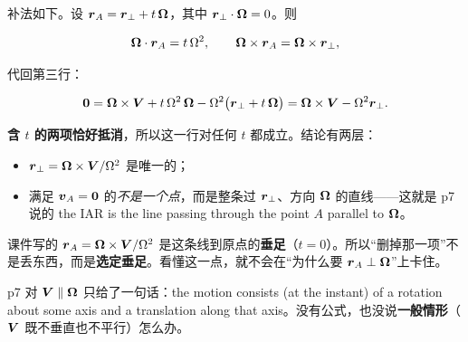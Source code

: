 \documentclass[11pt]{ctexart}
\begin{document}

补法如下。设 $\boldsymbol{r}_A=\boldsymbol{r}_\perp+t\,\boldsymbol{\Omega}$，其中 $\boldsymbol{r}_\perp\cdot\boldsymbol{\Omega}=0$。则

\[
\boldsymbol{\Omega}\cdot\boldsymbol{r}_A=t\,\Omega^{2},
\qquad
\boldsymbol{\Omega}\times\boldsymbol{r}_A=\boldsymbol{\Omega}\times\boldsymbol{r}_\perp ,
\]

代回第三行：

\[
\boldsymbol{0}=\boldsymbol{\Omega}\times\boldsymbol{V}
+t\,\Omega^{2}\,\boldsymbol{\Omega}
-\Omega^{2}\bigl(\boldsymbol{r}_\perp+t\,\boldsymbol{\Omega}\bigr)
=\boldsymbol{\Omega}\times\boldsymbol{V}-\Omega^{2}\boldsymbol{r}_\perp .
\]

\textbf{含 $t$ 的两项恰好抵消}，所以这一行对任何 $t$ 都成立。结论有两层：

\begin{itemize}
\item $\boldsymbol{r}_\perp=\boldsymbol{\Omega}\times\boldsymbol{V}/\Omega^{2}$ 是唯一的；
\item 满足 $\boldsymbol{v}_A=\boldsymbol{0}$ 的\emph{不是一个点}，而是整条过 $\boldsymbol{r}_\perp$、方向 $\boldsymbol{\Omega}$ 的直线——这就是 p7 说的 the IAR is the line passing through the point $A$ parallel to $\boldsymbol{\Omega}$。
\end{itemize}

课件写的 $\boldsymbol{r}_A=\boldsymbol{\Omega}\times\boldsymbol{V}/\Omega^{2}$ 是这条线到原点的\textbf{垂足}（$t=0$）。所以“删掉那一项”不是丢东西，而是\textbf{选定垂足}。看懂这一点，就不会在“为什么要 $\boldsymbol{r}_A\perp\boldsymbol{\Omega}$”上卡住。



p7 对 $\boldsymbol{V}\parallel\boldsymbol{\Omega}$ 只给了一句话：the motion consists (at the instant) of a rotation about some axis and a translation along that axis。没有公式，也没说\textbf{一般情形}（$\boldsymbol{V}$ 既不垂直也不平行）怎么办。

\end{document}
